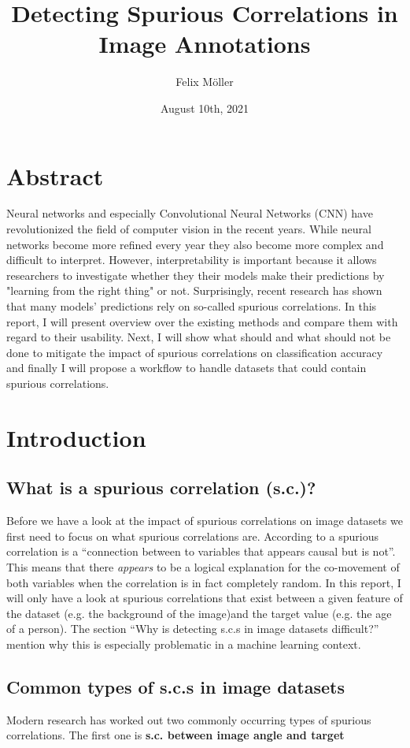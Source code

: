 \documentclass{article}
\title{Detecting Spurious Correlations in Image Annotations}
\author{Felix Möller}
\date{August 10th, 2021}
\begin{document}
\maketitle
\tableofcontents
\newpage
\section{Abstract}
Neural networks and especially Convolutional Neural Networks (CNN) have revolutionized the field of computer vision in the recent years. While neural networks become more refined every year they also become more complex and difficult to interpret. However, interpretability is important because it allows researchers to investigate whether they their models make their predictions by "learning from the right thing" or not. Surprisingly, recent research has shown that many models' predictions rely on so-called spurious correlations. In this report, I will present overview over the existing methods and compare them with regard to their usability. Next, I will show what should and what should not be done to mitigate the impact of spurious correlations on classification accuracy and finally I will propose a workflow to handle datasets that could contain spurious correlations. 
\section{Introduction}
\subsection{What is a spurious correlation (s.c.)?}
Before we have a look at the impact of spurious correlations on image datasets we first need to focus on what spurious correlations are. According to \cite{sc_def} a spurious correlation is a \enquote{connection between to variables that appears causal but is not}. This means that there \textit{appears} to be a logical explanation for the co-movement of both variables when the correlation is in fact completely random. In this report, I will only have a look at spurious correlations that exist between a given feature of the dataset (e.g. the background of the image)and the target value (e.g. the age of a person). The section \enquote{Why is detecting s.c.s in image datasets difficult?} mention why this is especially problematic in a machine learning context.

\subsection{Common types of s.c.s in image datasets}
Modern research has worked out two commonly occurring types of spurious correlations. The first one is \textbf{s.c. between image angle and target} \cite{}
\end{document}
